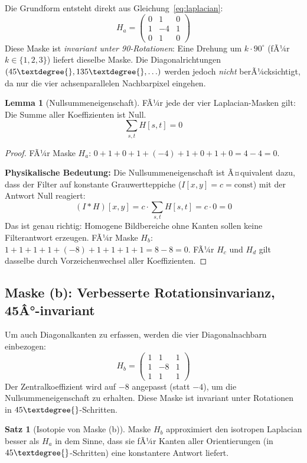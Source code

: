﻿\documentclass[a4paper,12pt]{article}
\theoremstyle{definition}
\newtheorem{satz}{Satz}
\newtheorem{lemma}{Lemma}
\begin{document}
Die Grundform entsteht direkt aus Gleichung~\eqref{eq:laplacian}:
\[
    H_a = \begin{pmatrix} 0 & 1 & 0 \\ 1 & -4 & 1 \\ 0 & 1 & 0 \end{pmatrix}
\]
Diese Maske ist \emph{invariant unter 90\textdegree{}-Rotationen}: Eine Drehung um $k \cdot 90^\circ$ (fÃ¼r
$k \in \{1,2,3\}$) liefert dieselbe Maske. Die Diagonalrichtungen $(45\textdegree{}, 135\textdegree{}, \ldots)$
werden jedoch \emph{nicht} berÃ¼cksichtigt, da nur die vier achsenparallelen Nachbarpixel
eingehen.

\begin{lemma}[Nullsummeneigenschaft]
\label{lem:nullsumme}
    FÃ¼r jede der vier Laplacian-Masken gilt: Die Summe aller Koeffizienten ist Null.
    \[
        \sum_{s,t} H[s,t] = 0
    \]
\end{lemma}

\begin{proof}
    FÃ¼r Maske $H_a$: $0+1+0+1+(-4)+1+0+1+0 = 4-4 = 0$.

    \textbf{Physikalische Bedeutung:} Die Nullsummeneigenschaft ist Ã¤quivalent dazu, dass der
    Filter auf konstante Grauwertteppiche ($I[x,y] = c = \text{const}$) mit der Antwort Null
    reagiert:
    \[
        (I * H)[x,y] = c \cdot \sum_{s,t} H[s,t] = c \cdot 0 = 0
    \]
    Das ist genau richtig: Homogene Bildbereiche ohne Kanten sollen keine Filterantwort erzeugen.
    FÃ¼r Maske $H_b$: $1+1+1+1+(-8)+1+1+1+1 = 8-8 = 0$. FÃ¼r $H_c$ und $H_d$ gilt dasselbe
    durch Vorzeichenwechsel aller Koeffizienten. \qedhere
\end{proof}

\subsection{Maske (b): Verbesserte Rotationsinvarianz, 45Â°-invariant}

Um auch Diagonalkanten zu erfassen, werden die vier Diagonalnachbarn einbezogen:
\[
    H_b = \begin{pmatrix} 1 & 1 & 1 \\ 1 & -8 & 1 \\ 1 & 1 & 1 \end{pmatrix}
\]
Der Zentralkoeffizient wird auf $-8$ angepasst (statt $-4$), um die Nullsummeneigenschaft
zu erhalten. Diese Maske ist invariant unter Rotationen in $45\textdegree{}$-Schritten.

\begin{satz}[Isotopie von Maske (b)]
\label{satz:isotrop}
    Maske $H_b$ approximiert den isotropen Laplacian besser als $H_a$ in dem Sinne, dass
    sie fÃ¼r Kanten aller Orientierungen (in $45\textdegree{}$-Schritten) eine konstantere Antwort liefert.
\end{satz}
\end{document}
